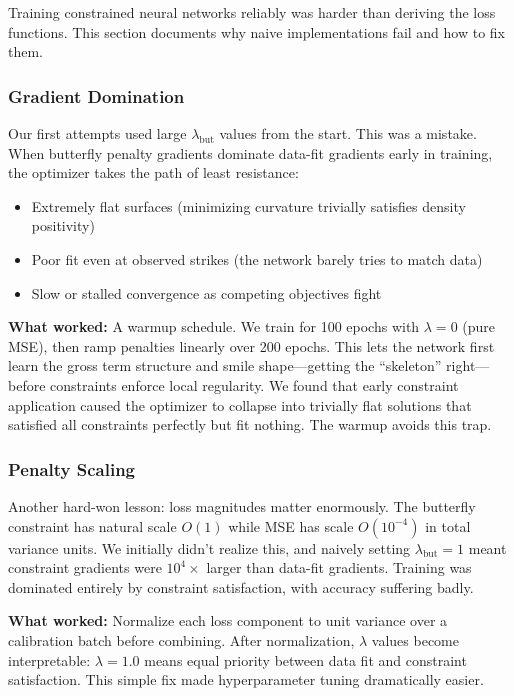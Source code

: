 \documentclass[11pt,a4paper]{article}
\begin{document}
Training constrained neural networks reliably was harder than deriving the loss functions. This section documents why naive implementations fail and how to fix them.

\subsubsection{Gradient Domination}

Our first attempts used large $\lambda_{\text{but}}$ values from the start. This was a mistake. When butterfly penalty gradients dominate data-fit gradients early in training, the optimizer takes the path of least resistance:
\begin{itemize}
    \item Extremely flat surfaces (minimizing curvature trivially satisfies density positivity)
    \item Poor fit even at observed strikes (the network barely tries to match data)
    \item Slow or stalled convergence as competing objectives fight
\end{itemize}

\textbf{What worked:} A warmup schedule. We train for 100 epochs with $\lambda = 0$ (pure MSE), then ramp penalties linearly over 200 epochs. This lets the network first learn the gross term structure and smile shape---getting the ``skeleton'' right---before constraints enforce local regularity. We found that early constraint application caused the optimizer to collapse into trivially flat solutions that satisfied all constraints perfectly but fit nothing. The warmup avoids this trap.

\subsubsection{Penalty Scaling}

Another hard-won lesson: loss magnitudes matter enormously. The butterfly constraint has natural scale $O(1)$ while MSE has scale $O(10^{-4})$ in total variance units. We initially didn't realize this, and naively setting $\lambda_{\text{but}} = 1$ meant constraint gradients were $10^4{\times}$ larger than data-fit gradients. Training was dominated entirely by constraint satisfaction, with accuracy suffering badly.

\textbf{What worked:} Normalize each loss component to unit variance over a calibration batch before combining. After normalization, $\lambda$ values become interpretable: $\lambda = 1.0$ means equal priority between data fit and constraint satisfaction. This simple fix made hyperparameter tuning dramatically easier.
\end{document}

